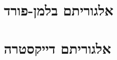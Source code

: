 \documentclass[]{article}
\def\insert#1{}
\begin{document}
\def\lecnum{8}
\def\topcis{
מסלולים קלים ביותר - בלמן פורד, דייקסטרה
}


\section*{אלגוריתם בלמן-פורד}
\insert{bellman}

\section*{אלגוריתם דייקסטרה}
\insert{dijkstra}
\end{document}
